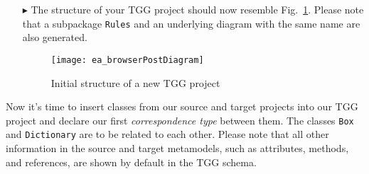 \begin{itemize}
\item[$\blacktriangleright$] The structure of your TGG project should now resemble Fig.~\ref{fig:new_tgg_project}. Please note that a subpackage \texttt{Rules}
and an underlying diagram with the same name are also generated.

\begin{figure}[htbp]
\begin{center}
  \texttt{[image: ea\_browserPostDiagram]}
  \caption{Initial structure of a new TGG project}  
  \label{fig:new_tgg_project}
\end{center}
\end{figure}
\end{itemize}
\clearpage

Now it's time to insert classes from our source and target projects into our TGG project and declare our first \emph{correspondence type} between them.
The classes \texttt{Box} and \texttt{Dictionary} are to be related to each other. Please note that all other information in the source and target metamodels,
such as attributes, methods, and references, are shown by default in the TGG schema.

